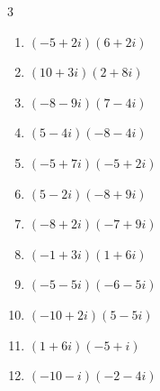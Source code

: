 \begin{multicols}{3}
\begin{enumerate}
        \phantom{$\displaystyle =-90-14i$}

  \item $\displaystyle (-5+2i)(6+2i)$

        \phantom{$\displaystyle =-34+2i$}

  \item $\displaystyle (10+3i)(2+8i)$

        \phantom{$\displaystyle =-4+86i$}

  \item $\displaystyle (-8-9i)(7-4i)$

        \phantom{$\displaystyle =-92-31i$}

  \item $\displaystyle (5-4i)(-8-4i)$

        \phantom{$\displaystyle =-56+12i$}

  \item $\displaystyle (-5+7i)(-5+2i)$

        \phantom{$\displaystyle =11-45i$}

  \item $\displaystyle (5-2i)(-8+9i)$

        \phantom{$\displaystyle =-22+61i$}

  \item $\displaystyle (-8+2i)(-7+9i)$

        \phantom{$\displaystyle =38-86i$}

\columnbreak %

\resetques

  \item $\displaystyle (-1+3i)(1+6i)$

        \phantom{$\displaystyle =-19-3i$}

  \item $\displaystyle (-5-5i)(-6-5i)$

        \phantom{$\displaystyle =5+55i$}

  \item $\displaystyle (-10+2i)(5-5i)$

        \phantom{$\displaystyle =-40+60i$}

  \item $\displaystyle (1+6i)(-5+i)$

        \phantom{$\displaystyle =-11-29i$}

  \item $\displaystyle (-10-i)(-2-4i)$

        \phantom{$\displaystyle =16+42i$}


\end{enumerate}
\end{multicols}
